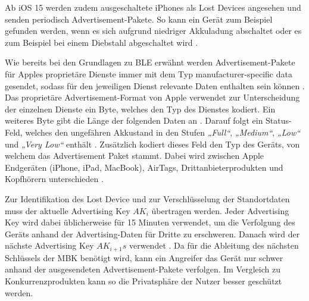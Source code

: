 Ab iOS 15 werden zudem ausgeschaltete iPhones als Lost Devices angesehen und senden periodisch Advertisement-Pakete.
So kann ein Gerät zum Beispiel gefunden werden, wenn es sich aufgrund niedriger Akkuladung abschaltet oder es zum Beispiel bei einem Diebstahl abgeschaltet wird \cite{Classen_FindMy}.

Wie bereits bei den Grundlagen zu \ac{BLE} erwähnt werden Advertisement-Pakete für Apples proprietäre Dienste immer mit dem Typ manufacturer-specific data gesendet, sodass für den jeweiligen Dienst relevante Daten enthalten sein können \cite{Spec_BLE_5.3}.
Das proprietäre Advertisement-Format von Apple verwendet zur Unterscheidung der einzelnen Dienste ein Byte, welches den Typ des Dienstes kodiert.
Ein weiteres Byte gibt die Länge der folgenden Daten an \cite{Martin_continuity,Heinrich_FindMy}.
Darauf folgt ein Status-Feld, welches den ungefähren Akkustand in den Stufen \textit{„Full“}, \textit{„Medium“}, \textit{„Low“} und \textit{„Very Low“} enthält \cite{Mayberry_Tracking}.
Zusätzlich kodiert dieses Feld den Typ des Geräts, von welchem das Advertisement Paket stammt.
Dabei wird zwischen Apple Endgeräten (iPhone, iPad, MacBook), AirTags, Drittanbieterprodukten und Kopfhörern unterschieden \cite{Heinrich_AirGuard,Mayberry_Tracking}.

Zur Identifikation des Lost Device und zur Verschlüsselung der Standortdaten muss der aktuelle Advertising Key $AK_i$ übertragen werden.
Jeder Advertising Key wird dabei üblicherweise für 15 Minuten verwendet, um die Verfolgung des Geräts anhand der Advertising-Daten für Dritte zu erschweren.
Danach wird der nächste Advertising Key $AK_{i+1}s$ verwendet \cite{Heinrich_FindMy}.
Da für die Ableitung des nächsten Schlüssels der \ac{MBK} benötigt wird, kann ein Angreifer das Gerät nur schwer anhand der ausgesendeten Advertisement-Pakete verfolgen.
Im Vergleich zu Konkurrenzprodukten kann so die Privatsphäre der Nutzer besser geschützt werden.

